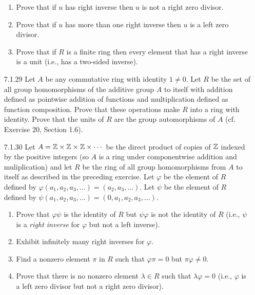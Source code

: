 \begin{enumerate}
\begin{enumerate}
                     \item Prove that if $u$ has right inverse then $u$ is not
                           a right zero divisor.
                     \item Prove that if $u$ has more than one right inverse
                           then $u$ is a left zero divisor.
                     \item Prove that if $R$ is a finite ring then every element
                           that has a right inverse is a unit (i.e., has a
                           two-sided inverse).
                  \end{enumerate}
   \item[7.1.29]  Let $A$ be any commutative ring with identity $1 \neq 0$. Let
                  $R$ be the set of all group homomorphisms of the additive
                  group $A$ to itself with addition defined as pointwise
                  addition of functions and multiplication defined as function
                  composition. Prove that these operations make $R$ into a ring
                  with identity. Prove that the units of $R$ are the group
                  automorphisms of $A$ (cf. Exercise 20, Section 1.6).
   \item[7.1.30]  Let $A = \mathbb{Z} \times \mathbb{Z} \times \mathbb{Z} \times \cdots$ be the direct
                  product of copies of $\mathbb{Z}$ indexed by the positive integers (so
                  $A$ is a ring under componentwise addition and muliplication)
                  and let $R$ be the ring of all group homomorphisms from $A$ to
                  itself as described in the preceding exercise. Let $\varphi$
                  be the element of $R$ defined by
                  $\varphi(a_1, a_2, a_3, \ldots) = (a_2, a_3, \ldots)$. Let
                  $\psi$ be the element of $R$ defined by
                  $\psi(a_1, a_2, a_3, \ldots) = (0, a_1, a_2, a_3, \ldots)$.
                  \begin{enumerate}
                     \item Prove that $\varphi\psi$ is the identity of $R$ but
                           $\psi\varphi$ is not the identity of $R$ (i.e.,
                           $\psi$ is a \textit{right inverse} for $\varphi$ but
                           not a left inverse).
                     \item Exhibit infinitely many right inverses for $\varphi$.
                     \item Find a nonzero element $\pi$ in $R$ such that
                           $\varphi\pi = 0$ but $\pi\varphi \neq 0$.
                     \item Prove that there is no nonzero element
                           $\lambda \in R$ such that $\lambda\varphi = 0$ (i.e.,
                           $\varphi$ is a left zero divisor but not a right zero
                           divisor).
                  \end{enumerate}
\end{enumerate}
